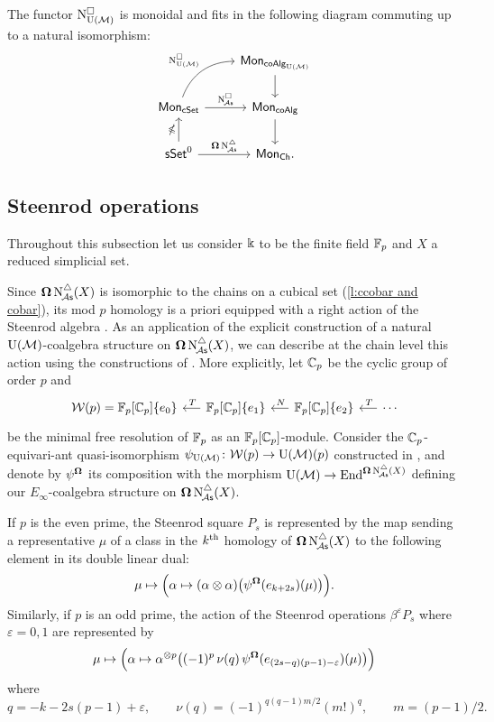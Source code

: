 \begin{lemma} \label{l:lift of cobar to e-infty}
	The functor $\operatorname{N^{\square}_{{\operatorname{U}(\mathcal{M})}}}$ is monoidal and fits in the following diagram commuting up to a natural isomorphism:
	\[
	\begin{tikzcd}
	& \Mon_{\coAlg_\UM} \arrow[d] \\
	\Mon_{\cSet} \arrow[ru, "\cchainsUM", out=70, in=180] \arrow[r, "\cchainsA"]
	& \Mon_{\coAlg} \arrow[d] \\
	\sSet^0 \arrow[r, "\cobar \schainsA"] \arrow[u, "\ccobar"]
	& \Mon_{\Ch}.
	\end{tikzcd}
	\]
\end{lemma}

\subsection{Steenrod operations}

Throughout this subsection let us consider $\Bbbk$ to be the finite field ${\mathbb{F}_p}$ and $X$ a reduced simplicial set.

Since $\operatorname{\mathbf{\Omega}} \operatorname{N^{\triangle}_{\!{\mathcal{A}\mathsf{s}}}}(X)$ is isomorphic to the chains on a cubical set (\cref{l:ccobar and cobar}), its mod $p$ homology is a priori equipped with a right action of the Steenrod algebra \cite{steenrod1962cohomology, milnor1958steenrod}.
As an application of the explicit construction of a natural ${\operatorname{U}(\mathcal{M})}$-coalgebra structure on $\operatorname{\mathbf{\Omega}} \operatorname{N^{\triangle}_{\!{\mathcal{A}\mathsf{s}}}}(X)$, we can describe at the chain level this action using the constructions of \cite{medina2021maysteenrod}.
More explicitly, let ${\mathbb{C}_p}$ be the cyclic group of order $p$ and
\[
\begin{tikzcd} [column sep = .5cm]
\cW(p) = \Fp[\Cp]\{e_0\} & \arrow[l, "\,T"'] \Fp[\Cp]\{e_1\} & \arrow[l, "\,N"'] \Fp[\Cp]\{e_2\} & \arrow[l, "\,T"'] \dotsb
\end{tikzcd}
\]
be the minimal free resolution of ${\mathbb{F}_p}$ as an ${\mathbb{F}_p}[{\mathbb{C}_p}]$-module.
Consider the ${\mathbb{C}_p}$-equivari-ant quasi-isomorphism $\psi_{\operatorname{U}(\mathcal{M})} \colon \mathcal{W}(p) \to {\operatorname{U}(\mathcal{M})}(p)$ constructed in \cite{medina2021maysteenrod}, and denote by $\psi^{\operatorname{\mathbf{\Omega}}}$ its composition with the morphism ${\operatorname{U}(\mathcal{M})} \to \mathrm{End}^{\operatorname{\mathbf{\Omega}} \operatorname{N^{\triangle}_{\!{\mathcal{A}\mathsf{s}}}}(X)}$ defining our $E_\infty$-coalgebra structure on $\operatorname{\mathbf{\Omega}} \operatorname{N^{\triangle}_{\!{\mathcal{A}\mathsf{s}}}}(X)$.

If $p$ is the even prime, the Steenrod square $P_s$ is represented by the map sending a representative $\mu$ of a class in the $k^{\mathrm{th}}$ homology of $\operatorname{\mathbf{\Omega}} \operatorname{N^{\triangle}_{\!{\mathcal{A}\mathsf{s}}}}(X)$ to the following element in its double linear dual:
\[
\mu \mapsto
\Big( \alpha \mapsto (\alpha \otimes \alpha) \big( \psi^{\operatorname{\mathbf{\Omega}}}(e_{k+2s})(\mu) \big) \Big).
\]
Similarly, if $p$ is an odd prime, the action of the Steenrod operations $\beta^\varepsilon P_{s}$ where $\varepsilon = 0,1$ are represented by
\[
\mu \mapsto
\Big( \alpha \mapsto \alpha^{\otimes p} \big( (-1)^p \, \nu(q) \, \psi^{\operatorname{\mathbf{\Omega}}}(e_{(2s-q)(p-1)-\varepsilon})(\mu) \big) \Big)
\]
where
\[
q = -k -2s(p-1)+\varepsilon, \qquad
\nu(q) = (-1)^{q(q-1)m/2}(m!)^q, \qquad
m = (p-1)/2.
\]

